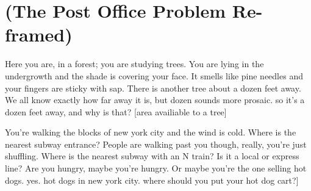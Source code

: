 \documentclass[12pt,twoside]{reedthesis}
\begin{document}

\appendix
  \chapter{(The Post Office Problem Re-framed)}
  \label{appendix_one}
  Here you are, in a forest; you are studying trees. You are lying in the undergrowth and the shade is covering your face. It smells like pine needles and your fingers are sticky with sap. There is another tree about a dozen feet away. We all know exactly how far away it is, but dozen sounds more prosaic. so it's a dozen feet away, and why is that? [area availiable to a tree]\par
  You're walking the blocks of new york city and the wind is cold. Where is the nearest subway entrance? People are walking past you though, really, you're just shuffling. Where is the nearest subway with an N train? Is it a local or express line? Are you hungry, maybe you're hungry. Or maybe you're the one selling hot dogs. yes. hot dogs in new york city. where should you put your hot dog cart?] 
\backmatter
% 

\end{document}
